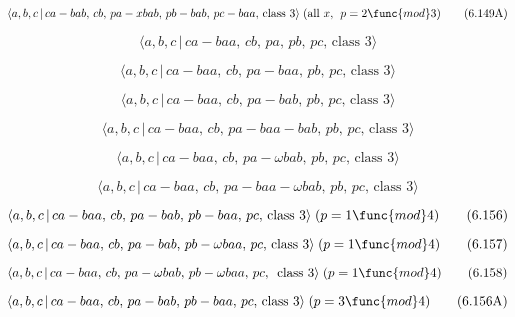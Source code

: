 \documentclass[10pt]{article}
\begin{document}
\begin{equation}
\langle a,b,c\,|\,ca-bab,\,cb,\,pa-xbab,\,pb-bab,\,pc-baa,\,\text{class }%
3\rangle\;(\text{all }x,\,\;p=2 \func{mod} 3)  \tag{6.149A}
\end{equation}

\begin{equation}
\langle a,b,c\,|\,ca-baa,\,cb,\,pa,\,pb,\,pc,\,\text{class }3\rangle 
\tag{6.150}
\end{equation}

\begin{equation}
\langle a,b,c\,|\,ca-baa,\,cb,\,pa-baa,\,pb,\,pc,\,\text{class }3\rangle 
\tag{6.151}
\end{equation}

\begin{equation}
\langle a,b,c\,|\,ca-baa,\,cb,\,pa-bab,\,pb,\,pc,\,\text{class }3\rangle 
\tag{6.152}
\end{equation}

\begin{equation}
\langle a,b,c\,|\,ca-baa,\,cb,\,pa-baa-bab,\,pb,\,pc,\,\text{class }3\rangle
\tag{6.153}
\end{equation}

\begin{equation}
\langle a,b,c\,|\,ca-baa,\,cb,\,pa-\omega bab,\,pb,\,pc,\,\text{class }%
3\rangle  \tag{6.154}
\end{equation}

\begin{equation}
\langle a,b,c\,|\,ca-baa,\,cb,\,pa-baa-\omega bab,\,pb,\,pc,\,\text{class }%
3\rangle  \tag{6.155}
\end{equation}

\begin{equation}
\langle a,b,c\,|\,ca-baa,\,cb,\,pa-bab,\,pb-baa,\,pc,\,\text{class }%
3\rangle\;(p=1 \func{mod} 4)  \tag{6.156}
\end{equation}

\begin{equation}
\langle a,b,c\,|\,ca-baa,\,cb,\,pa-bab,\,pb-\omega baa,\,pc,\,\text{class }%
3\rangle\;(p=1 \func{mod} 4)  \tag{6.157}
\end{equation}

\begin{equation}
\langle a,b,c\,|\,ca-baa,\,cb,\,pa-\omega bab,\,pb-\omega baa,\,pc,\,\text{
class }3\rangle\;(p=1 \func{mod} 4)  \tag{6.158}
\end{equation}

\begin{equation}
\langle a,b,c\,|\,ca-baa,\,cb,\,pa-bab,\,pb-baa,\,pc,\,\text{class }%
3\rangle\;(p=3 \func{mod} 4)  \tag{6.156A}
\end{equation}
\end{document}
